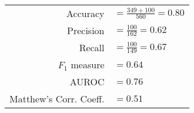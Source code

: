 \begin{tabular}{rl}
\rule{0pt}{12pt} Accuracy & $= \frac{349 + 100}{560} = 0.80$  \tabularnewline
\rule{0pt}{12pt} Precision & $= \frac{100}{162} = 0.62$ \tabularnewline
\rule{0pt}{12pt} Recall & $= \frac{100}{149} = 0.67$  \tabularnewline
\rule{0pt}{12pt} $F_1$ measure & $= 0.64$ \tabularnewline
\rule{0pt}{12pt} AUROC &$= 0.76$ \tabularnewline
\rule{0pt}{12pt} Matthew's Corr. Coeff. & $= 0.51$ \tabularnewline
\end{tabular}
